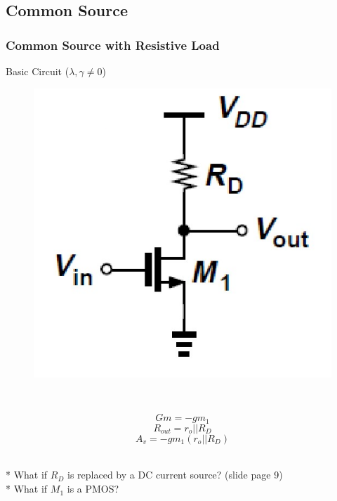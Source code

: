 \documentclass{beamer}
\begin{document}
\subsection{Common Source} %

\begin{frame}
\frametitle{Common Source with Resistive Load}
\begin{minipage}{0.48\linewidth}
    Basic Circuit ($\lambda, \gamma\not=0$)
    \begin{figure}[H]
        \centering
        \includegraphics[width=0.8\linewidth]{common-source-R}
    \end{figure}
\end{minipage}
\, 
\begin{minipage}{0.48\linewidth}
    \begin{equation*}
        Gm = -gm_1
    \end{equation*} 
    \begin{equation*}
        R_{out} = r_o||R_D
    \end{equation*}
    \begin{equation*}
        A_v = -gm_1(r_o||R_D)
    \end{equation*}
\end{minipage}\\
* What if $R_D$ is replaced by a DC current source? (slide page 9)\\
* What if $M_1$ is a PMOS?
\end{frame}
\end{document}

